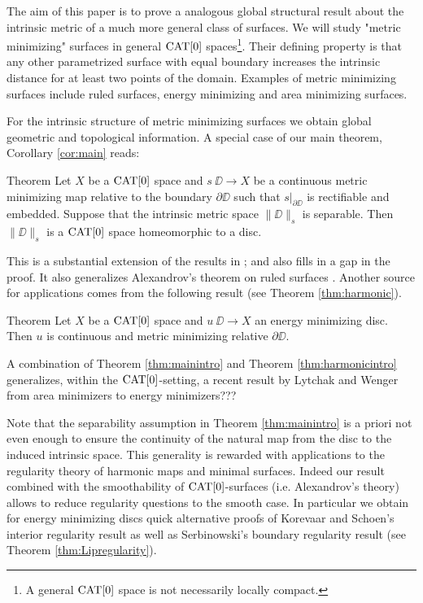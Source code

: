 \documentclass[a4paper,10pt]{amsart}
\begin{document}
The aim of this paper is to prove a analogous global structural result about the intrinsic metric of a much more general class of surfaces.
We will study "metric minimizing" surfaces in general $\mathop{\rm CAT}\nolimits[0]$ spaces\footnote{A general $\mathop{\rm CAT}\nolimits[0]$ space is not necessarily locally compact.}. 
Their defining property is that any other parametrized surface with
equal boundary increases the intrinsic distance for at least two points of the domain. Examples of metric minimizing surfaces include
ruled surfaces, energy minimizing and area minimizing surfaces. 


 For the intrinsic structure of metric minimizing surfaces 
we obtain global geometric and topological information. A special case of our main theorem, Corollary \ref{cor:main} reads:

\begin{thm}{Theorem}\label{thm:mainintro}
Let $X$ be a $\mathop{\rm CAT}\nolimits[0]$ space 
and $s\:\DD\to X$ be a continuous metric minimizing map relative to the boundary $\partial\DD$ such that $s|_{\partial\DD}$ is rectifiable
and embedded.
Suppose that the intrinsic metric space $\|\DD\|_s$  is separable. Then $\|\DD\|_s$ is a $\mathop{\rm CAT}\nolimits[0]$ space homeomorphic to a disc.
\end{thm}

This is a substantial extension of the results in \cite{petrunin-metric-min}; and also fills in a gap in the proof. 
It also generalizes Alexandrov's theorem on ruled surfaces \cite{A}.
Another source for applications comes from the following result (see Theorem \ref{thm:harmonic}).

\begin{thm}{Theorem}\label{thm:harmonicintro}
Let $X$ be a $\mathop{\rm CAT}\nolimits[0]$ space 
and $u\:\DD\to X$ an energy minimizing disc.
Then $u$ is continuous and metric minimizing relative $\partial\DD$.
\end{thm}

A combination of Theorem \ref{thm:mainintro} and Theorem \ref{thm:harmonicintro} generalizes, within the $\mathop{\rm CAT}\nolimits[0]$-setting,
a recent result by Lytchak and Wenger from area minimizers to energy minimizers???


Note that the separability assumption in Theorem \ref{thm:mainintro} is a priori not even enough to ensure the continuity of the natural 
map from the disc to the induced intrinsic space. This generality is rewarded with applications to the regularity theory of harmonic maps 
and minimal surfaces. Indeed our result combined with the smoothability of $\mathop{\rm CAT}\nolimits[0]$-surfaces (i.e. Alexandrov's theory) 
allows to reduce regularity questions to the smooth case. In particular we obtain for energy minimizing discs quick alternative proofs of Korevaar and Schoen's interior regularity
result \cite{KS} as well as Serbinowski's boundary regularity result \cite{Se} (see Theorem \ref{thm:Lipregularity}). 
\end{document}
